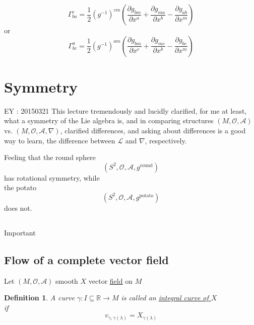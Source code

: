 \documentclass[10pt]{amsart}
\newtheorem{definition}{Definition}
\begin{document}
\begin{multicols*}{2}
	
	
	
	\[
	\boxed{ \Gamma^c_{ba} = \frac{1}{2} (g^{-1})^{cm} \left( \frac{ \partial g_{bm} }{ \partial x^a} + \frac{ \partial g_{ma}}{ \partial x^b} - \frac{ \partial g_{ab}}{ \partial x^m} \right) }
	\]
	or 
	\[
	\Gamma^a_{bc} = \frac{1}{2} (g^{-1})^{am} \left( \frac{ \partial g_{bm}}{\partial x^c} + \frac{ \partial g_{mc}}{ \partial x^b} - \frac{ \partial g_{bc}}{ \partial x^m} \right)
	\]
	
	
	\section{Symmetry}
	
	EY : 20150321 This lecture tremendously and lucidly clarified, for me at least, what a symmetry of the Lie algebra is, and in comparing structures $(M,\mathcal{O}, \mathcal{A})$ vs. $(M,\mathcal{O}, \mathcal{A}, \nabla)$, clarified differences, and asking about differences is a good way to learn, the difference between $\mathcal{L}$ and $\nabla$, respectively.  
	
	Feeling that the round sphere
	\[
	(S^2, \mathcal{O}, \mathcal{A},g^{\text{round}})
	\]
	has rotational symmetry, while \\
	the potato
	\[
	(S^2, \mathcal{O},\mathcal{A}, g^{\text{potato}})
	\]
	does not.  
	
	\subsection{}
	
	\subsection{}
	
	Important
	
	\subsection{Flow of a complete vector field}
	
	Let $(M,\mathcal{O},\mathcal{A})$ smooth $X$ vector \underline{field} on $M$
	
	\begin{definition}
		A curve $\gamma :I \subseteq \mathbb{R} \to M$ is called an \underline{integral curve of $X$} \\
		if 
		\[
		v_{\gamma,\gamma(\lambda)} = X_{\gamma(\lambda)}
		\]
	\end{definition}
	

\end{multicols*}
\end{document}
